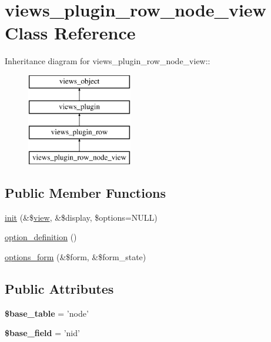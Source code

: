 \hypertarget{classviews__plugin__row__node__view}{
\section{views\_\-plugin\_\-row\_\-node\_\-view Class Reference}
\label{classviews__plugin__row__node__view}
}
Inheritance diagram for views\_\-plugin\_\-row\_\-node\_\-view::\begin{figure}[H]
\begin{center}
\leavevmode
\includegraphics[height=4cm]{classviews__plugin__row__node__view}
\end{center}
\end{figure}
\subsection*{Public Member Functions}
\begin{CompactItemize}
\item 
\hyperlink{classviews__plugin__row__node__view_3bb6fb204cefdab520d24765a8f916ba}{init} (\&\$\hyperlink{classview}{view}, \&\$display, \$options=NULL)
\item 
\hyperlink{classviews__plugin__row__node__view_f489a0ff40c6b85382d9611cce0c509b}{option\_\-definition} ()
\item 
\hyperlink{classviews__plugin__row__node__view_7bc31b38a1cc4474695af3a564fde775}{options\_\-form} (\&\$form, \&\$form\_\-state)
\end{CompactItemize}
\subsection*{Public Attributes}
\begin{CompactItemize}
\item 
\hypertarget{classviews__plugin__row__node__view_24bbaae2ffd937d231ff9918a7c4067e}{
\textbf{\$base\_\-table} = 'node'}
\label{classviews__plugin__row__node__view_24bbaae2ffd937d231ff9918a7c4067e}

\item 
\hypertarget{classviews__plugin__row__node__view_e77441cc82786f0acca947e12a38c922}{
\textbf{\$base\_\-field} = 'nid'}
\label{classviews__plugin__row__node__view_e77441cc82786f0acca947e12a38c922}

\end{CompactItemize}



